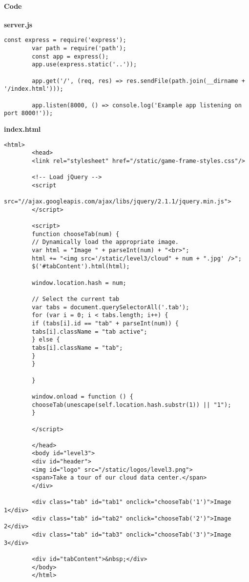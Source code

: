 \begin{Exercise}[label={websec-xss-game}]
		\paragraph{Code}
		
		\textbf{server.js}
		\begin{lstlisting}[style=JavaScript]
		const express = require('express');
		var path = require('path');
		const app = express();
		app.use(express.static('..'));
		
		app.get('/', (req, res) => res.sendFile(path.join(__dirname + '/index.html')));
		
		app.listen(8000, () => console.log('Example app listening on port 8000!'));
		\end{lstlisting}
		\textbf{index.html}
		\begin{lstlisting}[style=JavaScript]
		<html>
		<head>
		<link rel="stylesheet" href="/static/game-frame-styles.css"/>
		
		<!-- Load jQuery -->
		<script
		src="//ajax.googleapis.com/ajax/libs/jquery/2.1.1/jquery.min.js">
		</script>
		
		<script>
		function chooseTab(num) {
		// Dynamically load the appropriate image.
		var html = "Image " + parseInt(num) + "<br>";
		html += "<img src='/static/level3/cloud" + num + ".jpg' />";
		$('#tabContent').html(html);
		
		window.location.hash = num;
		
		// Select the current tab
		var tabs = document.querySelectorAll('.tab');
		for (var i = 0; i < tabs.length; i++) {
		if (tabs[i].id == "tab" + parseInt(num)) {
		tabs[i].className = "tab active";
		} else {
		tabs[i].className = "tab";
		}
		}
		
		}
		
		window.onload = function () {
		chooseTab(unescape(self.location.hash.substr(1)) || "1");
		}
		
		</script>
		
		</head>
		<body id="level3">
		<div id="header">
		<img id="logo" src="/static/logos/level3.png">
		<span>Take a tour of our cloud data center.</span>
		</div>
		
		<div class="tab" id="tab1" onclick="chooseTab('1')">Image 1</div>
		<div class="tab" id="tab2" onclick="chooseTab('2')">Image 2</div>
		<div class="tab" id="tab3" onclick="chooseTab('3')">Image 3</div>
		
		<div id="tabContent">&nbsp;</div>
		</body>
		</html>
		\end{lstlisting}
		

\end{Exercise}
